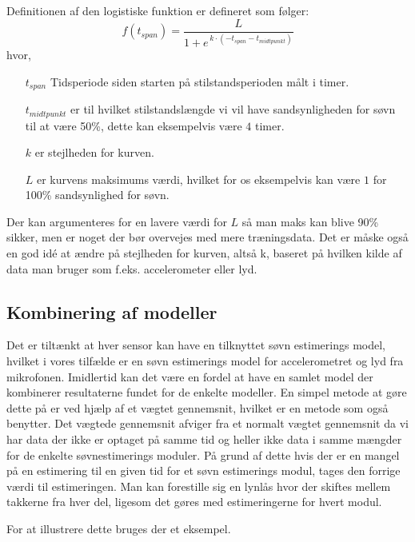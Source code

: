 Definitionen af den logistiske funktion er defineret som følger:
\begin{equation}
	f(t_{span}) = \frac{L}{1+e^{\,k\cdot(-t_{span} - t_{midtpunkt})}}
\end{equation} 
hvor,
\begin{itemize}
	\item[$t_{span}$] Tidsperiode siden starten på stilstandsperioden målt i timer.
	\item[$t_{midtpunkt}$] er til hvilket stilstandslængde vi vil have sandsynligheden for søvn til at være 50\%, dette kan eksempelvis være $4$ timer.
	\item[$k$] er stejlheden for kurven.
	\item[$L$] er kurvens maksimums værdi, hvilket for os eksempelvis kan være $1$ for 100\% sandsynlighed for søvn.
\end{itemize}

Der kan argumenteres for en lavere værdi for $L$ så man maks kan blive 90\% sikker, men er noget der bør overvejes med mere træningsdata. Det er måske også en god idé at ændre på stejlheden for kurven, altså k, baseret på hvilken kilde af data man bruger som f.eks. accelerometer eller lyd.

\subsection{Kombinering af modeller}\label{subsec:kombimodeller}
Det er tiltænkt at hver sensor kan have en tilknyttet søvn estimerings model, hvilket i vores tilfælde er en søvn estimerings model for accelerometret og lyd fra mikrofonen.
Imidlertid kan det være en fordel at have en samlet model der kombinerer resultaterne fundet for de enkelte modeller.
En simpel metode at gøre dette på er ved hjælp af et vægtet gennemsnit, hvilket er en metode som \citet{6563918} også benytter.
Det vægtede gennemsnit afviger fra et normalt vægtet gennemsnit da vi har data der ikke er optaget på samme tid og heller ikke data i samme mængder for de enkelte søvnestimerings moduler.
På grund af dette hvis der er en mangel på en estimering til en given tid for et søvn estimerings modul, tages den forrige værdi til estimeringen.
Man kan forestille sig en lynlås hvor der skiftes mellem takkerne fra hver del, ligesom det gøres med estimeringerne for hvert modul.

For at illustrere dette bruges der et eksempel.

\newcommand{\nv}{Ingen estimering}

